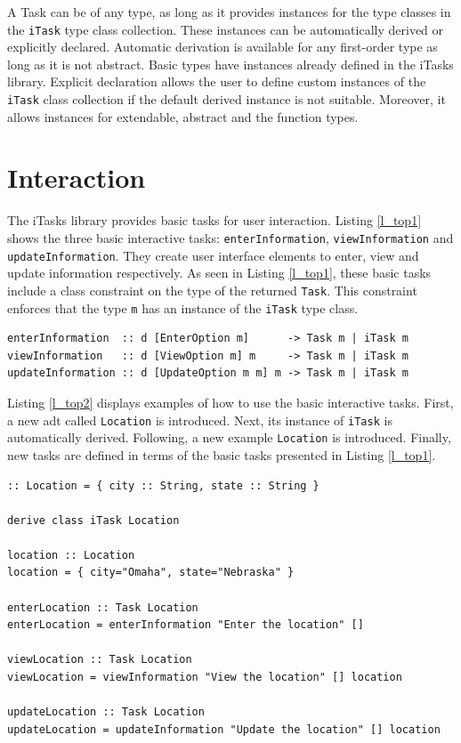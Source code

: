 A Task can be of any type, as long as it provides instances for the type classes in the \texttt{iTask} type class collection. These instances can be automatically derived or explicitly declared. Automatic derivation is available for any first-order type as long as it is not abstract. Basic types have instances already defined in the \gls{iTasks} library. Explicit declaration allows the user to define custom instances of the \texttt{iTask} class collection if the default derived instance is not suitable. Moreover, it allows instances for extendable, abstract and the function types. 

\section{Interaction}\label{interaction}

The \gls{iTasks} library provides basic tasks for user interaction. Listing \ref{l_top1} shows the three basic interactive tasks: \texttt{enterInformation}, \texttt{viewInformation} and \texttt{updateInformation}. They create user interface elements to enter, view and update information respectively. As seen in Listing \ref{l_top1}, these basic tasks include a class constraint on the type of the returned \texttt{Task}. This constraint enforces that the type \texttt{m} has an instance of the \texttt{iTask} type class. 

\begin{lstlisting}[caption=\gls{iTasks} basic interaction functions,captionpos=b,label=l_top1]
enterInformation  :: d [EnterOption m]      -> Task m | iTask m
viewInformation   :: d [ViewOption m] m     -> Task m | iTask m
updateInformation :: d [UpdateOption m m] m -> Task m | iTask m 
\end{lstlisting}


Listing \ref{l_top2} displays examples of how to use the basic interactive tasks. First, a new \ac{adt} called \texttt{Location} is introduced. Next, its instance of \texttt{iTask} is automatically derived. Following, a new example \texttt{Location} is introduced. Finally, new tasks are defined in terms of the basic tasks presented in Listing \ref{l_top1}. 


\begin{lstlisting}[caption=Example of basic \gls{iTasks} interaction functions,captionpos=b,label=l_top2]
:: Location = { city :: String, state :: String }

derive class iTask Location

location :: Location
location = { city="Omaha", state="Nebraska" }

enterLocation :: Task Location
enterLocation = enterInformation "Enter the location" []

viewLocation :: Task Location
viewLocation = viewInformation "View the location" [] location

updateLocation :: Task Location
updateLocation = updateInformation "Update the location" [] location
\end{lstlisting}

